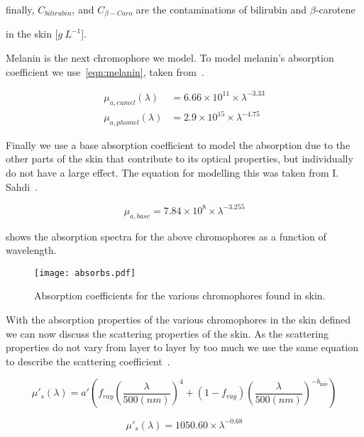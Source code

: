 \indent finally, $C_{bilirubin}$, and $C_{\beta-Caro}$ are the contaminations of bilirubin and $\beta$-carotene 

\indent in the skin [$g\ L^{-1}$].

\medskip

Melanin is the next chromophore we model.
To model melanin's absorption coefficient we use~\cref{eqn:melanin}, taken from~\cite{iglesias2015biophysically}.

\begin{align}
\mu_{a,eumel}(\lambda)&=6.66\times10^{11} \times \lambda^{-3.33}\\
\mu_{a,phomel}(\lambda)&=2.9\times10^{15} \times \lambda^{-4.75}
\label{eqn:melanin}
\end{align}

Finally we use a base absorption coefficient to model the absorption due to the other parts of the skin that contribute to its optical properties, but individually do not have a large effect.
The equation for modelling this was taken from I. Sahdi~\cite{saidi1992transcutaneous}.

\begin{equation}
\mu_{a,base}=7.84\times10^{8}\times\lambda^{-3.255}
\label{eqn:base}
\end{equation}


 shows the absorption spectra for the above chromophores as a function of wavelength.

\begin{figure}[!htpb]
	\centering
	\texttt{[image: absorbs.pdf]}
	\caption{Absorption coefficients for the various chromophores found in skin.}
	\label{fig:absorcoeff}
\end{figure}

With the absorption properties of the various chromophores in the skin defined we can now discuss the scattering properties of the skin.
As the scattering properties do not vary from layer to layer by too much we use the same equation to describe the scattering coefficient~\cite{jacques2013optical,iglesias2015biophysically,louisethesis}.

\begin{equation}
\mu'_s(\lambda)=a'\left(f_{ray}\left(\frac{\lambda}{500(nm)}\right)^4+(1-f_{ray})\left(\frac{\lambda}{500(nm)}\right)^{-b_{\text{mie}}}\right)
\label{eqn:scattrest}
\end{equation}

\begin{equation}
\mu'_s(\lambda)=1050.60\times\lambda^{-0.68}
\label{eqn:hyposcat}
\end{equation}


